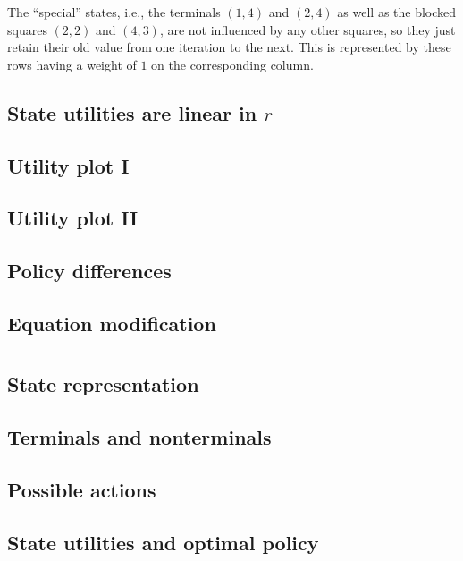\documentclass[letterpaper, 10pt]{article}
\begin{document}
\begin{multicols}{2}
The ``special'' states, i.e., the terminals $(1,4)$ and $(2,4)$ as well as the blocked squares $(2,2)$ and $(4,3)$, are not influenced by any other squares, so they just retain their old value from one iteration to the next. This is represented by these rows having a weight of $1$ on the corresponding column.


\subsection{State utilities are linear in $r$}

\subsection{Utility plot I}

\subsection{Utility plot II}

\subsection{Policy differences}

\subsection{Equation modification}


\section{}
\subsection{State representation}

\subsection{Terminals and nonterminals}

\subsection{Possible actions}

\subsection{State utilities and optimal policy}

\end{multicols}
\end{document}

